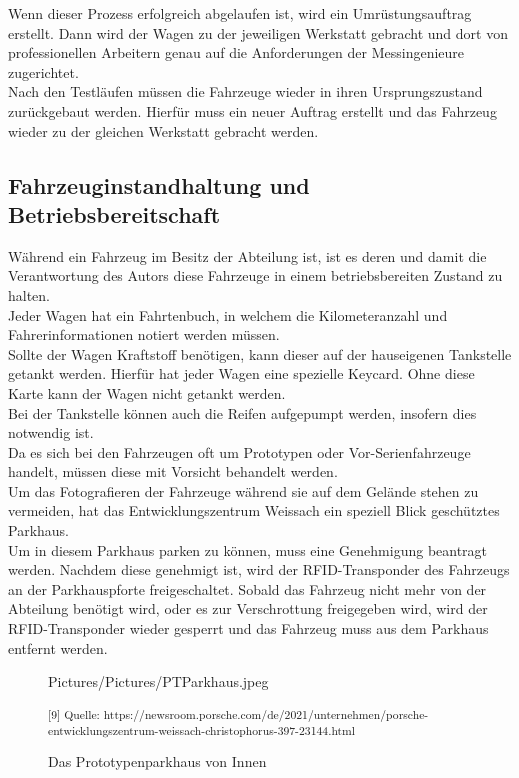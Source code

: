 Wenn dieser Prozess erfolgreich abgelaufen ist, wird ein Umrüstungsauftrag erstellt. Dann wird der Wagen zu der jeweiligen Werkstatt gebracht und dort von professionellen Arbeitern genau auf die Anforderungen der Messingenieure zugerichtet. \\

Nach den Testläufen müssen die Fahrzeuge wieder in ihren Ursprungszustand zurückgebaut werden. Hierfür muss ein neuer Auftrag erstellt und das Fahrzeug wieder zu der gleichen Werkstatt gebracht werden. \\

\subsection{Fahrzeuginstandhaltung und Betriebsbereitschaft}

Während ein Fahrzeug im Besitz der Abteilung ist, ist es deren und damit die Verantwortung des Autors diese Fahrzeuge in einem betriebsbereiten Zustand zu halten.\\
Jeder Wagen hat ein Fahrtenbuch, in welchem die Kilometeranzahl und Fahrerinformationen notiert werden müssen. \\
Sollte der Wagen Kraftstoff benötigen, kann dieser auf der hauseigenen Tankstelle getankt werden. Hierfür hat jeder Wagen eine spezielle Keycard. Ohne diese Karte kann der Wagen nicht getankt werden. \\

Bei der Tankstelle können auch die Reifen aufgepumpt werden, insofern dies notwendig ist. \\

Da es sich bei den Fahrzeugen oft um Prototypen oder Vor-Serienfahrzeuge handelt, müssen diese mit Vorsicht behandelt werden. \\
Um das Fotografieren der Fahrzeuge während sie auf dem Gelände stehen zu vermeiden, hat das Entwicklungszentrum Weissach ein speziell Blick geschütztes Parkhaus.\\
Um in diesem Parkhaus parken zu können, muss eine Genehmigung beantragt werden. Nachdem diese genehmigt ist, wird der RFID-Transponder des Fahrzeugs an der Parkhauspforte freigeschaltet. Sobald das Fahrzeug nicht mehr von der Abteilung benötigt wird, oder es zur Verschrottung freigegeben wird, wird der RFID-Transponder wieder gesperrt und das Fahrzeug muss aus dem Parkhaus entfernt werden. \\

\begin{figure}[H]
	\begin{center}
		\begin{overpic}[width=\linewidth]{Pictures/Pictures/PTParkhaus.jpeg}
			
		\end{overpic}
		
		\caption{Das Prototypenparkhaus von Innen}
		
		\small\textsuperscript{[9] Quelle: https://newsroom.porsche.com/de/2021/unternehmen/porsche-entwicklungszentrum-weissach-christophorus-397-23144.html}
		\label{PT}
	\end{center}
\end{figure}  


